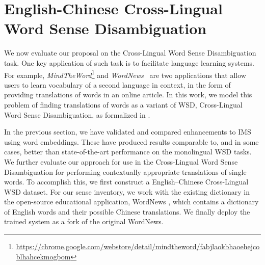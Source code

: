 \section{English-Chinese Cross-Lingual Word Sense Disambiguation}
\label{section:CLWSD}





We now evaluate our proposal on the Cross-Lingual Word Sense
Disambiguation task.  One key application of such task is to
facilitate language learning systems.  For example, {\it
 MindTheWord}\footnote{\url{https://chrome.google.com/webstore/detail/mindtheword/fabjlaokbhaoehejcoblhahcekmogbom}}
and {\it WordNews}~\cite{tao2014} are two applications that allow
users to learn vocabulary of a second language in context, in the form
of providing translations of words in an online article.
In this work, we model this problem of finding translations of words
as a variant of WSD, Cross-Lingual Word Sense Disambiguation, as
formalized in \cite{tao2014}.

In the previous section, we have validated and compared enhancements to
IMS using word embeddings. These have produced results comparable to,
and in some cases, better than state-of-the-art performance on the
monolingual WSD tasks. We further evaluate our approach for use in the
Cross-Lingual Word Sense Disambiguation for performing contextually
appropriate translations of single words. To accomplish this, we first
construct a English--Chinese Cross-Lingual WSD dataset. For our sense
inventory, we work with the existing dictionary in the open-source
educational application, WordNews \cite{tao2014}, which contains a
dictionary of English words and their possible Chinese
translations. We finally deploy the trained system as a fork of the
original WordNews.

